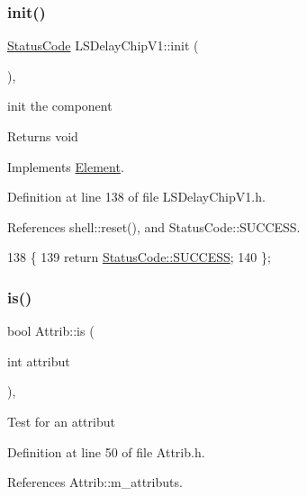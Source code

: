 \subsubsection{\texorpdfstring{init()}{init()}}
{\footnotesize\ttfamily \hyperlink{classStatusCode}{Status\+Code} L\+S\+Delay\+Chip\+V1\+::init (\begin{DoxyParamCaption}{ }\end{DoxyParamCaption})\hspace{0.3cm}{\ttfamily [inline]}, {\ttfamily [virtual]}}

init the component

\begin{DoxyReturn}{Returns}
void 
\end{DoxyReturn}


Implements \hyperlink{classElement_af42754b5cabc198869222725218d695c}{Element}.



Definition at line 138 of file L\+S\+Delay\+Chip\+V1.\+h.



References shell\+::reset(), and Status\+Code\+::\+S\+U\+C\+C\+E\+SS.


\begin{DoxyCode}
138                     \{
139     \textcolor{keywordflow}{return} \hyperlink{classStatusCode_a6f565cbeadc76d14c72f047e5e85eb4badd0da38d3ba0d922efd1f4619bc37ad8}{StatusCode::SUCCESS};
140   \};
\end{DoxyCode}
\mbox{\label{classAttrib_a704f26af560909ad22065083bb7d4c34}} 
\subsubsection{\texorpdfstring{is()}{is()}}
{\footnotesize\ttfamily bool Attrib\+::is (\begin{DoxyParamCaption}\item[{int}]{attribut }\end{DoxyParamCaption})\hspace{0.3cm}{\ttfamily [inline]}, {\ttfamily [inherited]}}

Test for an attribut 

Definition at line 50 of file Attrib.\+h.



References Attrib\+::m\+\_\+attributs.



